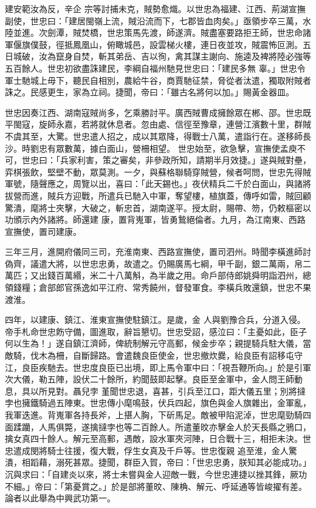 \begin{pinyinscope}
 建安範汝為反，辛企
 宗等討捕未克，賊勢愈熾。以世忠為福建、江西、荊湖宣撫副使，世忠曰：「建居閩嶺上流，賊沿流而下，七郡皆血肉矣。」亟領步卒三萬，水陸並進。次劍潭，賊焚橋，世忠策馬先渡，師遂濟。賊盡塞要路拒王師，世忠命諸軍偃旗僕鼓，徑抵鳳凰山，俯瞰城邑，設雲梯火樓，連日夜並攻，賊震怖叵測。五日城破，汝為竄身自焚，斬其弟岳、吉以徇，禽其謀主謝向、施逵及裨將陸必強等五百餘人。世忠初欲盡誅建民，李綱自福州馳見世忠曰：「建民多無
 辜。」世忠令軍士馳城上毋下，聽民自相別，農給牛谷，商賈馳征禁，脅從者汰遣，獨取附賊者誅之。民感更生，家為立祠。捷聞，帝曰：「雖古名將何以加。」賜黃金器皿。



 世忠因奏江西、湖南寇賊尚多，乞乘勝討平。廣西賊曹成擁餘眾在郴、邵。世忠既平閩寇，旋師永嘉，若將就休息者。忽由處、信徑至豫章，連營江濱數十里，群賊不虞其至，大驚。世忠遣人招之，成以其眾降，得戰士八萬，遣詣行在。遂移師長沙。時劉忠有眾數萬，據白面山，營柵相望。
 世忠始至，欲急擊，宣撫使孟庾不可，世忠曰：「兵家利害，策之審矣，非參政所知，請期半月效捷。」遂與賊對壘，弈棋張飲，堅壁不動，眾莫測。一夕，與蘇格聯騎穿賊營，候者呵問，世忠先得賊軍號，隨聲應之，周覽以出，喜曰：「此天錫也。」夜伏精兵二千於白面山，與諸將拔營而進，賊兵方迎戰，所遣兵已馳入中軍，奪望樓，植旗蓋，傳呼如雷，賊回顧驚潰，麾將士夾擊，大破之，斬忠首，湖南遂平。授太尉，賜帶、笏，仍敕樞密以功頒示內外諸將。師還建
 康，置背嵬軍，皆勇鷙絕倫者。九月，為江南東、西路宣撫使，置司建康。



 三年三月，進開府儀同三司，充淮南東、西路宣撫使，置司泗州。時聞李橫進師討偽齊，議遣大將，以世忠忠勇，故遣之。仍賜廣馬七綱，甲千副，銀二萬兩，帛二萬匹；又出錢百萬緡，米二十八萬斛，為半歲之用。命戶部侍郎姚舜明詣泗州，總領錢糧；倉部郎官孫逸如平江府、常秀饒州，督發軍食。李橫兵敗還鎮，世忠不果渡淮。



 四年，以建康、鎮江、淮東宣撫使駐鎮江。是歲，金
 人與劉豫合兵，分道入侵。帝手札命世忠飭守備，圖進取，辭旨懇切。世忠受詔，感泣曰：「主憂如此，臣子何以生為！」遂自鎮江濟師，俾統制解元守高郵，候金步卒；親提騎兵駐大儀，當敵騎，伐木為柵，自斷歸路。會遣魏良臣使金，世忠撤炊爨，紿良臣有詔移屯守江，良臣疾馳去。世忠度良臣已出境，即上馬令軍中曰：「視吾鞭所向。」於是引軍次大儀，勒五陣，設伏二十餘所，約聞鼓即起擊。良臣至金軍中，金人問王師動息，具以所見對。聶兒孛
 堇聞世忠退，喜甚，引兵至江口，距大儀五里；別將撻孛也擁鐵騎過五陣東。世忠傳小麾鳴鼓，伏兵四起，旗色與金人旗雜出，金軍亂，我軍迭進。背嵬軍各持長斧，上揕人胸，下斫馬足。敵被甲陷泥淖，世忠麾勁騎四面蹂躪，人馬俱斃，遂擒撻孛也等二百餘人。所遣董旼亦擊金人於天長縣之鴉口，擒女真四十餘人。解元至高郵，遇敵，設水軍夾河陣，日合戰十三，相拒未決。世忠遣成閔將騎士往援，復大戰，俘生女真及千戶等。世忠復親
 追至淮，金人驚潰，相蹈藉，溺死甚眾。捷聞，群臣入賀，帝曰：「世忠忠勇，朕知其必能成功。」沉與求曰：「自建炎以來，將士未嘗與金人迎敵一戰，今世忠連捷以挫其鋒，厥功不細。」帝曰：「第憂賞之。」於是部將董旼、陳桷、解元、呼延通等皆峻擢有差。論者以此舉為中興武功第一。




\end{pinyinscope}
